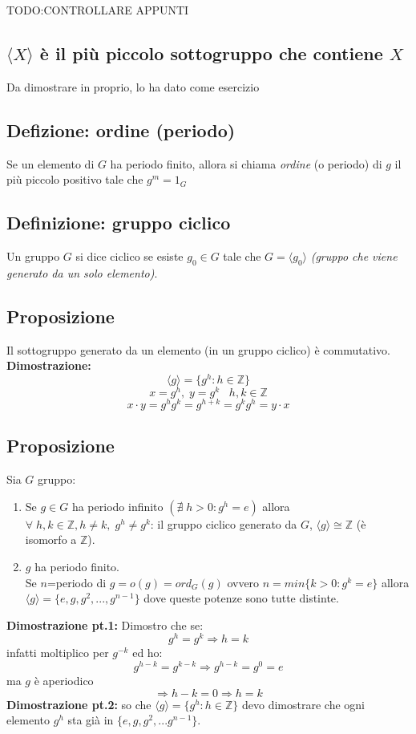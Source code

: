 TODO:CONTROLLARE APPUNTI

\subsection{\(\langle X\rangle\) è il più piccolo sottogruppo che contiene \(X\)}
Da dimostrare in proprio, lo ha dato come esercizio

\subsection{Defizione: ordine (periodo)}
Se un elemento di \(G\) ha periodo finito, allora si chiama \textit{ordine} (o periodo) di \(g\) il più piccolo positivo tale che \(g^m=1_G\)

\subsection{Definizione: gruppo ciclico}
Un gruppo \(G\) si dice ciclico se esiste \(g_0\in G\) tale che \(G=\langle g_0\rangle\) \textit{(gruppo che viene generato da un solo elemento)}.

\subsection{Proposizione}
Il sottogruppo generato da un elemento (in un gruppo ciclico) è commutativo.
\\
\textbf{Dimostrazione:}
\[\langle g\rangle =\{g^h:h\in\mathbb{Z}\}\]
\[x=g^h,\;y=g^k\;\;\;h,k\in\mathbb{Z}\]
\[x\cdot y=g^hg^k=g^{h+k}=g^kg^h=y\cdot x\]

\subsection{Proposizione}
Sia \(G\) gruppo:
\begin{enumerate}

	\item Se \(g\in G\) ha periodo infinito \((\nexists \;h>0:g^h=e)\) allora \(\forall\; h,k\in\mathbb{Z}, h\neq k,\;g^h\neq g^k\): il gruppo ciclico generato da \(G\), \(\langle g\rangle \cong\mathbb{Z}\) (è isomorfo a $\mathbb{Z}$).

	\item \(g\) ha periodo finito.
	\\Se \(n\)=periodo di \(g=o(g)=ord_G(g)\) %
	ovvero \(n=min\{k>0: g^k=e\}\) allora \(\langle g\rangle=\{e,g,g^2,...,g^{n-1}\}\) dove queste potenze sono tutte distinte.

\end{enumerate}
\textbf{Dimostrazione pt.1:} Dimostro che se:
\[g^h=g^k\Rightarrow h=k\]
infatti moltiplico per \(g^{-k}\) ed ho:
\[g^{h-k}=g^{k-k}\Rightarrow g^{h-k}=g^0=e\]
ma \(g\) è aperiodico 
\[\Rightarrow h-k=0\Rightarrow h=k\]
\textbf{Dimostrazione pt.2:} so che \(\langle g\rangle =\{g^h:h\in\mathbb{Z}\}\) devo dimostrare che ogni elemento \(g^h\) sta già in \(\{e,g,g^2,...g^{n-1}\}\).

